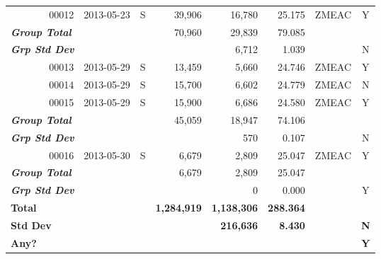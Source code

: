 \documentclass{article}
\begin{document}
\begin{longtable}{rlcrrrlc}
\color{Goldenrod1}00012&
2013-05-23&
S&
\color{Goldenrod1}39,906&
\color{Goldenrod1}16,780&
\color{Goldenrod1}25.175&
ZMEAC&
\color{green}Y\\
\multicolumn{1}{l}{\bfseries{}\itshape{}\color{Tomato1}Group Total}&
&
&
\color{Goldenrod1}70,960&
\color{Goldenrod1}29,839&
\color{Goldenrod1}79.085&
&
\\
\multicolumn{1}{l}{\bfseries{}\itshape{}\color{Tomato1}Grp Std Dev}&
&
&
&
\color{Goldenrod1}6,712&
\color{Goldenrod1}1.039&
&
\color{red}N\\
\color{Goldenrod1}00013&
2013-05-29&
S&
\color{Goldenrod1}13,459&
\color{Goldenrod1}5,660&
\color{Goldenrod1}24.746&
ZMEAC&
\color{green}Y\\
\color{Goldenrod1}00014&
2013-05-29&
S&
\color{Goldenrod1}15,700&
\color{Goldenrod1}6,602&
\color{Goldenrod1}24.779&
ZMEAC&
\color{red}N\\
\color{Goldenrod1}00015&
2013-05-29&
S&
\color{Goldenrod1}15,900&
\color{Goldenrod1}6,686&
\color{Goldenrod1}24.580&
ZMEAC&
\color{green}Y\\
\multicolumn{1}{l}{\bfseries{}\itshape{}\color{Tomato1}Group Total}&
&
&
\color{Goldenrod1}45,059&
\color{Goldenrod1}18,947&
\color{Goldenrod1}74.106&
&
\\
\multicolumn{1}{l}{\bfseries{}\itshape{}\color{Tomato1}Grp Std Dev}&
&
&
&
\color{Goldenrod1}570&
\color{Goldenrod1}0.107&
&
\color{red}N\\
\color{Goldenrod1}00016&
2013-05-30&
S&
\color{Goldenrod1}6,679&
\color{Goldenrod1}2,809&
\color{Goldenrod1}25.047&
ZMEAC&
\color{green}Y\\
\multicolumn{1}{l}{\bfseries{}\itshape{}\color{Tomato1}Group Total}&
&
&
\color{Goldenrod1}6,679&
\color{Goldenrod1}2,809&
\color{Goldenrod1}25.047&
&
\\
\multicolumn{1}{l}{\bfseries{}\itshape{}\color{Tomato1}Grp Std Dev}&
&
&
&
\color{Goldenrod1}0&
\color{Goldenrod1}0.000&
&
\color{green}Y\\
\multicolumn{1}{l}{\bfseries{}\color{Blue2}Total}&
&
&
\bfseries{}\color{Goldenrod1}1,284,919&
\bfseries{}\color{Goldenrod1}1,138,306&
\bfseries{}\color{Goldenrod1}288.364&
&
\\
\multicolumn{1}{l}{\bfseries{}\color{Blue2}Std Dev}&
&
&
&
\bfseries{}\color{Goldenrod1}216,636&
\bfseries{}\color{Goldenrod1}8.430&
&
\bfseries{}\color{red}N\\
\multicolumn{1}{l}{\bfseries{}\color{Blue2}Any?}&
&
&
&
&
&
&
\bfseries{}\color{green}Y\\
\end{longtable}
\end{document}
